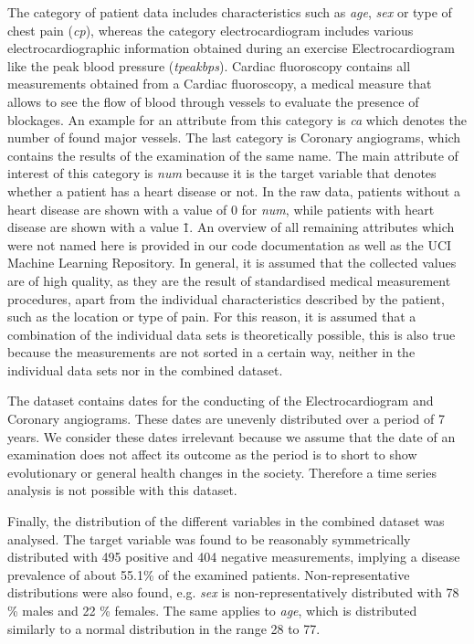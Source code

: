 The category of patient data includes characteristics such as \textit{age}, \textit{sex} or type of chest pain (\textit{cp}), whereas the category electrocardiogram includes various electrocardiographic information obtained during an exercise Electrocardiogram like the peak blood pressure (\textit{tpeakbps}). Cardiac fluoroscopy contains all measurements obtained from a Cardiac fluoroscopy, a medical measure that allows to see the flow of blood through vessels to evaluate the presence of blockages. An example for an attribute from this category is \textit{ca} which denotes the number of found major vessels. The last category is Coronary angiograms, which contains the results of the examination of the same name. The main attribute of interest of this category is \textit{num} because it is the target variable that denotes whether a patient has a heart disease or not. In the raw data, patients without a heart disease are shown with a value of 0 for \textit{num}, while patients with heart disease are shown with a value \>\= 1. 
An overview of all remaining attributes which were not named here is provided in our code documentation as well as the UCI Machine Learning Repository\citep{janosi1988}. In general, it is assumed that the collected values are of high quality, as they are the result of standardised medical measurement procedures, apart from the individual characteristics described by the patient, such as the location or type of pain. For this reason, it is assumed that a combination of the individual data sets is theoretically possible, this is also true because the measurements are not sorted  in a certain way, neither in the individual data sets nor in the combined dataset. 

The dataset contains dates for the conducting of the Electrocardiogram and Coronary angiograms. These dates are unevenly distributed over a period of 7 years. We consider these dates irrelevant because we assume that the date of an examination does not affect its outcome as the period is to short to show evolutionary or general health changes in the society. Therefore a time series analysis is not possible with this dataset.

Finally, the distribution of the different variables in the combined dataset was analysed. The target variable was found to be reasonably symmetrically distributed with 495 positive and 404 negative measurements, implying a disease prevalence of about 55.1\% of the examined patients. Non-representative distributions were also found, e.g. \textit{sex} is non-representatively distributed with 78 \% males and 22 \% females. The same applies to \textit{age}, which is distributed similarly to a normal distribution in the range 28 to 77.

